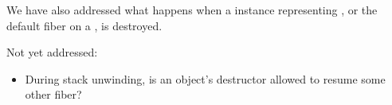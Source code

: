 We have also addressed what happens when a \fiber instance representing \main,
or the default fiber on a \thread, is destroyed.

Not yet addressed:

\begin{itemize}
    \item During stack unwinding, is an object's destructor allowed to resume
      some other fiber?
\end{itemize}
